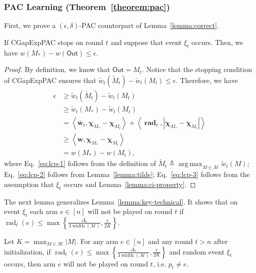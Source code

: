 \documentclass{article}
\newcommand{\AlgorithmPAC}{{\small \textsf{CGapExpPAC}}\xspace}
\newcommand{\M}{\mathcal M}
\DeclareMathOperator{\rank}{width}
\DeclareMathOperator{\rad}{rad}
\DeclareMathOperator*{\argmax}{arg\,max}
\newcommand{\out}{\mathsf{Out}}
\newcommand{\inn}[1]{\left\langle #1 \right\rangle}
\renewcommand{\vec}[1]{\boldsymbol{#1}}
\begin{document}
\subsubsection{PAC Learning (Theorem~\ref{theorem:pac})}
First, we prove a $(\epsilon,\delta)$-PAC counterpart of Lemma~\ref{lemma:correct}.
\begin{lemma}
\label{lemma:pac-correct}
If \AlgorithmPAC stops on round $t$ and suppose that event $\xi_t$ occurs. 
Then, we have $w(M_*)-w(\out) \le \epsilon$.
\end{lemma}

\begin{proof}
By definition, we know that $\out = M_t$.
Notice that the stopping condition of \AlgorithmPAC ensures that $\tilde w_t(\tilde M_t) - \tilde w_t(M_t) \le \epsilon$.
Therefore, we have
\begin{align}
	\epsilon &\ge \tilde w_t(\tilde M_t) - \tilde w_t(M_t) \nonumber \\
           &\ge \tilde w_t(M_*) - \tilde w_t(M_t) \label{eq:lcp-1} \\
           &= \inn{\vec {\bar w}_t, \vec \chi_{M_*}-\vec\chi_{M_t}}+\inn{\vec \rad_t, |\vec \chi_{M_*}-\vec\chi_{M_t}|} \label{eq:lcp-2}\\
           &\ge \inn{\vec w, \vec \chi_{M_*}-\vec\chi_{M_t}}  \label{eq:lcp-3} \\
           &= w(M_*)-w(M_t),\nonumber
\end{align}
where Eq.~\eqref{eq:lcp-1} follows from the definition of $\tilde M_t \triangleq \argmax_{M\in \M}\tilde w_t(M)$;
Eq.~\eqref{eq:lcp-2} follows from Lemma~\ref{lemma:tilde};
Eq.~\eqref{eq:lcp-3} follows from the assumption that $\xi_t$ occurs and Lemma~\ref{lemma:ci-property}.
\end{proof}

The next lemma generalizes Lemma~\ref{lemma:key-technical}.  
It shows that on event $\xi_t$ each arm $e\in [n]$ will not be played on round $t$ if $\rad_t(e) \le \max\left\{\frac{\Delta_e}{3\rank(\M)}, \frac{\epsilon}{2K}\right\}$.
\begin{lemma}
\label{lemma:pac-key}
Let $K = \max_{M\in \M} |M|$.
For any arm $e \in [n]$ and any round $t > n$ after initialization, if $\rad_t(e) \le \max\left\{\frac{\Delta_e}{3\rank(\M)}, \frac{\epsilon}{2K}\right\}$ and random event $\xi_t$ occurs,
then arm $e$ will not be played on round $t$, i.e. $p_t\not= e$.
\end{lemma}
\end{document}
